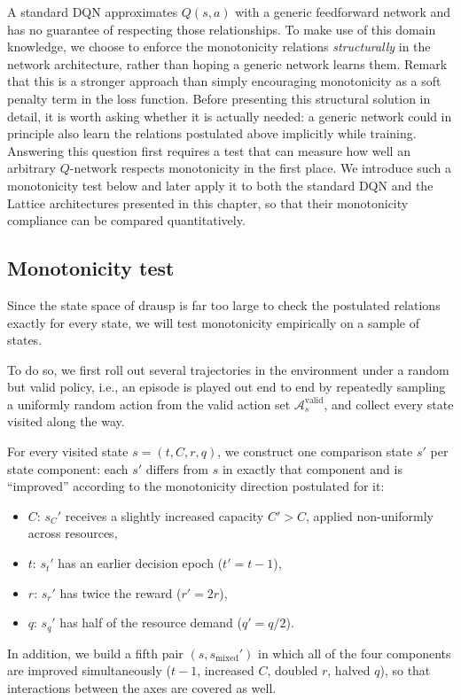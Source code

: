 A standard DQN approximates $Q(s,a)$ with a generic feedforward
network and has no guarantee of respecting those relationships.
To make use of this domain knowledge, we choose to enforce the monotonicity relations \textit{structurally} in the network architecture, rather than hoping a generic network learns them. Remark that this is a stronger approach than simply encouraging monotonicity as a soft penalty term in the loss function.
Before presenting this structural solution in detail, it is worth asking whether it is actually needed: a generic network could in principle also learn the relations postulated above implicitly while training. Answering this question first requires a test that can measure how well an arbitrary
$Q$-network respects monotonicity in the first place. We introduce such a monotonicity test below and later apply it to both the standard DQN and the Lattice architectures presented in this chapter, so that their monotonicity compliance can be compared quantitatively.

\subsection{Monotonicity test}
\label{subsec:monotonicity-test}

Since the state space of \ac{drausp} is far too large to check the postulated relations exactly for every state, we will test monotonicity empirically on a sample of states.

To do so, we first roll out several trajectories in the environment under a random but valid policy, i.e., an episode is played out end to end by repeatedly sampling a uniformly random action from the valid action set $\mathcal{A}_s^{\text{valid}}$, and collect every state visited along the way.

For every visited state $s=(t,C,r,q)$, we construct one comparison state $s'$ per state component: each $s'$ differs from $s$ in exactly that component and is ``improved'' according to the monotonicity direction postulated for it:
\begin{itemize}
  \item $C$: $s_C'$ receives a slightly increased capacity $C' > C$, applied non-uniformly across resources,
  \item $t$: $s_t'$ has an earlier decision epoch ($t' = t-1$),
  \item $r$: $s_r'$ has twice the reward ($r' = 2r$),
  \item $q$: $s_q'$ has half of the resource demand ($q' = q/2$).
\end{itemize}
In addition, we build a fifth pair $(s,s_{\text{mixed}}')$ in which all of the four components are improved simultaneously ($t-1$, increased $C$, doubled $r$, halved $q$), so that interactions between the axes are covered as well.

